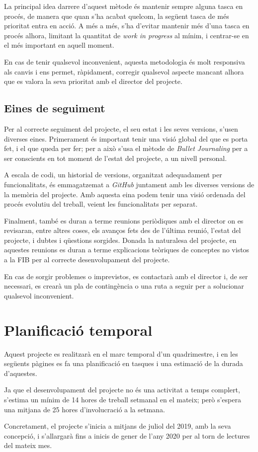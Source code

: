 \documentclass[a4paper]{article} %
\begin{document}
	La principal idea darrere d'aquest mètode és mantenir sempre alguna tasca en procés, de manera que quan s'ha acabat quelcom, la següent tasca de més prioritat entra en acció. A més a més, s'ha d'evitar mantenir més d'una tasca en procés alhora, limitant la quantitat de \textit{work in progress} al mínim, i centrar-se en el més important en aquell moment.
	\par
	En cas de tenir qualsevol inconvenient, aquesta metodologia és molt responsiva als canvis i ens permet, ràpidament, corregir qualsevol aspecte mancant alhora que es valora la seva prioritat amb el director del projecte.
	
	\subsection{Eines de seguiment}
	Per al correcte seguiment del projecte, el seu estat i les seves versions, s'usen diverses eines. Primerament és important tenir una visió global del que es porta fet, i el que queda per fer; per a això s'usa el mètode de \textit{Bullet Journaling} per a ser conscients en tot moment de l'estat del projecte, a un nivell personal. \par
	A escala de codi, un historial de versions, organitzat adequadament per funcionalitats, és emmagatzemat a \textit{GitHub} juntament amb les diverses versions de la memòria del projecte. Amb aquesta eina podem tenir una visió ordenada del procés evolutiu del treball, veient les funcionalitats per separat.\par
	Finalment, també es duran a terme reunions periòdiques amb el director on es revisaran, entre altres coses, els avanços fets des de l'última reunió, l'estat del projecte, i dubtes i qüestions sorgides. Donada la naturalesa del projecte, en aquestes reunions es duran a terme explicacions teòriques de conceptes no vistos a la FIB per al correcte desenvolupament del projecte.
	\par
	En cas de sorgir problemes o imprevistos, es contactarà amb el director i, de ser necessari, es crearà un pla de contingència o una ruta a seguir per a solucionar qualsevol inconvenient.
	 

	\section{Planificació temporal}
	Aquest projecte es realitzarà en el marc temporal d'un quadrimestre, i en les següents pàgines es fa una planificació en tasques i una estimació de la durada d'aquestes.\par 
	Ja que el desenvolupament del projecte no és una activitat a temps complert, s'estima un mínim de 14 hores de treball setmanal en el mateix; però s'espera una mitjana de 25 hores d'involucració a la setmana. \par 
	Concretament, el projecte s'inicia a mitjans de juliol del 2019, amb la seva concepció, i s'allargarà fins a inicis de gener de l'any 2020 per al torn de lectures del mateix mes.
	
\end{document}
